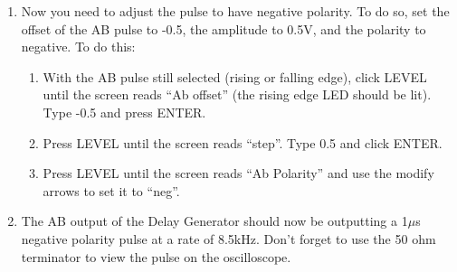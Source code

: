 \documentclass{../lab}
\begin{document}
\begin{enumerate}
\begin{enumerate}
\begin{enumerate}
        \end{enumerate}

        \item Now you need to adjust the pulse to have negative polarity. To do so, set the offset of the AB pulse to -0.5, the amplitude to 0.5V, and the polarity to negative. To do this:
        \begin{enumerate}
            \item With the AB pulse still selected (rising or falling edge), click LEVEL until the screen reads ``Ab offset'' (the rising edge LED should be lit). Type -0.5 and press ENTER.

            \item Press LEVEL until the screen reads ``step''. Type 0.5 and click ENTER.

            \item Press LEVEL until the screen reads ``Ab Polarity'' and use the modify arrows to set it to ``neg''.

        \end{enumerate}

        \item The AB output of the Delay Generator should now be outputting a 1$\mu$s negative polarity pulse at a rate of 8.5kHz. Don't forget to use the 50 ohm terminator to view the pulse on the oscilloscope.

    \end{enumerate}


\end{enumerate}
\end{document}
